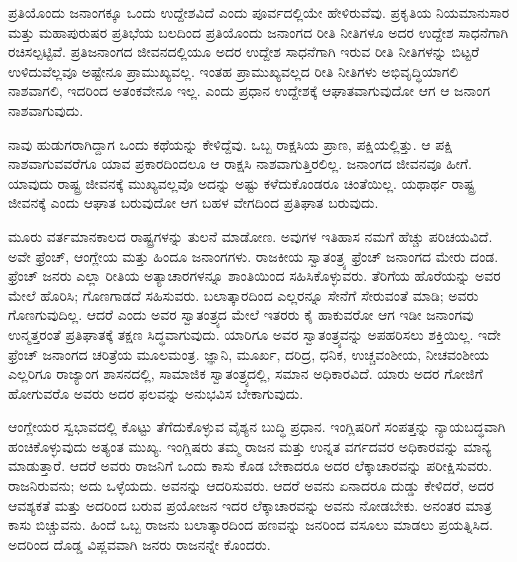 ಪ್ರತಿಯೊಂದು ಜನಾಂಗಕ್ಕೂ ಒಂದು ಉದ್ದೇಶವಿದೆ ಎಂದು ಪೂರ್ವದಲ್ಲಿಯೇ ಹೇಳಿರು\-ವೆವು. ಪ್ರಕೃತಿಯ ನಿಯಮಾನುಸಾರ ಮತ್ತು ಮಹಾಪುರುಷರ ಪ್ರತಿಭೆಯ ಬಲದಿಂದ ಪ್ರತಿಯೊಂದು ಜನಾಂಗದ ರೀತಿ ನೀತಿಗಳೂ ಅದರ ಉದ್ದೇಶ ಸಾಧನೆಗಾಗಿ ರಚಿಸಲ್ಪಟ್ಟಿವೆ. ಪ್ರತಿಜನಾಂಗದ ಜೀವನದಲ್ಲಿಯೂ ಅದರ ಉದ್ದೇಶ ಸಾಧನೆಗಾಗಿ ಇರುವ ರೀತಿ ನೀತಿಗಳನ್ನು ಬಿಟ್ಟರೆ ಉಳಿದುವೆಲ್ಲವೂ ಅಷ್ಟೇನೂ ಪ್ರಾಮುಖ್ಯವಲ್ಲ. ಇಂತಹ ಪ್ರಾಮುಖ್ಯವಲ್ಲದ ರೀತಿ ನೀತಿಗಳು ಅಭಿವೃದ್ಧಿಯಾಗಲಿ ನಾಶವಾಗಲಿ, ಇದರಿಂದ ಅತಂಕವೇನೂ ಇಲ್ಲ. ಎಂದು ಪ್ರಧಾನ ಉದ್ದೇಶಕ್ಕೆ ಆಘಾತವಾಗುವುದೋ ಆಗ ಆ ಜನಾಂಗ ನಾಶವಾಗುವುದು.

ನಾವು ಹುಡುಗರಾಗಿದ್ದಾಗ ಒಂದು ಕಥೆಯನ್ನು ಕೇಳಿದ್ದೆವು. ಒಬ್ಬ ರಾಕ್ಷಸಿಯ ಪ್ರಾಣ, ಪಕ್ಷಿಯಲ್ಲಿತ್ತು. ಆ ಪಕ್ಷಿ ನಾಶವಾಗುವವರೆಗೂ ಯಾವ ಪ್ರಕಾರದಿಂದಲೂ ಆ ರಾಕ್ಷಸಿ ನಾಶವಾಗುತ್ತಿರಲಿಲ್ಲ. ಜನಾಂಗದ ಜೀವನವೂ ಹೀಗೆ. ಯಾವುದು ರಾಷ್ಟ್ರ ಜೀವನಕ್ಕೆ ಮುಖ್ಯವಲ್ಲವೊ ಅದನ್ನು ಅಷ್ಟು ಕಳೆದುಕೊಂಡರೂ ಚಿಂತೆಯಿಲ್ಲ. ಯಥಾರ್ಥ ರಾಷ್ಟ್ರ ಜೀವನಕ್ಕೆ ಎಂದು ಆಘಾತ ಬರುವುದೋ ಆಗ ಬಹಳ ವೇಗದಿಂದ ಪ್ರತಿಘಾತ ಬರುವುದು.

ಮೂರು ವರ್ತಮಾನಕಾಲದ ರಾಷ್ಟ್ರಗಳನ್ನು ತುಲನೆ ಮಾಡೋಣ. ಅವುಗಳ ಇತಿಹಾಸ ನಮಗೆ ಹೆಚ್ಚು ಪರಿಚಯವಿದೆ. ಅವೇ ಫ್ರೆಂಚ್​, ಆಂಗ್ಲೇಯ ಮತ್ತು ಹಿಂದೂ ಜನಾಂಗಗಳು. ರಾಜಕೀಯ ಸ್ವಾತಂತ್ರ್ಯ ಫ್ರೆಂಚ್​ ಜನಾಂಗದ ಮೇರು ದಂಡ. ಫ್ರೆಂಚ್​ ಜನರು ಎಲ್ಲಾ ರೀತಿಯ ಅತ್ಯಾಚಾರಗಳನ್ನೂ ಶಾಂತಿಯಿಂದ ಸಹಿಸಿಕೊಳ್ಳುವರು. ತೆರಿಗೆಯ ಹೊರೆಯನ್ನು ಅವರ ಮೇಲೆ ಹೊರಿಸಿ; ಗೊಣಗಾಡದೆ ಸಹಿಸುವರು. ಬಲಾತ್ಕಾರದಿಂದ ಎಲ್ಲರನ್ನೂ ಸೇನೆಗೆ ಸೇರುವಂತೆ ಮಾಡಿ; ಅವರು ಗೊಣಗುವುದಿಲ್ಲ. ಆದರೆ ಎಂದು ಅವರ ಸ್ವಾತಂತ್ರ್ಯದ ಮೇಲೆ ಇತರರು ಕೈ ಹಾಕುವರೋ ಆಗ ಇಡೀ ಜನಾಂಗವು ಉನ್ಮತ್ತರಂತೆ ಪ್ರತಿಘಾತಕ್ಕೆ ತಕ್ಷಣ ಸಿದ್ಧವಾಗುವುದು. ಯಾರಿಗೂ ಅವರ ಸ್ವಾತಂತ್ರ್ಯವನ್ನು ಅಪಹರಿಸಲು ಶಕ್ತಿಯಿಲ್ಲ. ಇದೇ ಫ್ರೆಂಚ್​ ಜನಾಂಗದ ಚರಿತ್ರೆಯ ಮೂಲಮಂತ್ರ. ಜ್ಞಾನಿ, ಮೂರ್ಖ, ದರಿದ್ರ, ಧನಿಕ, ಉಚ್ಚವಂಶೀಯ, ನೀಚವಂಶೀಯ ಎಲ್ಲರಿಗೂ ರಾಜ್ಯಾಂಗ ಶಾಸನದಲ್ಲಿ, ಸಾಮಾಜಿಕ ಸ್ವಾತಂತ್ರ್ಯದಲ್ಲಿ, ಸಮಾನ ಅಧಿಕಾರವಿದೆ. ಯಾರು ಅದರ ಗೋಜಿಗೆ ಹೋಗುವರೊ ಅವರು ಅದರ ಫಲವನ್ನು ಅನುಭವಿಸ ಬೇಕಾಗುವುದು.

ಆಂಗ್ಲೇಯರ ಸ್ವಭಾವದಲ್ಲಿ ಕೊಟ್ಟು ತೆಗೆದುಕೊಳ್ಳುವ ವೈಶ್ಯನ ಬುದ್ಧಿ ಪ್ರಧಾನ. ಇಂಗ್ಲಿಷರಿಗೆ ಸಂಪತ್ತನ್ನು ನ್ಯಾಯಬದ್ಧವಾಗಿ ಹಂಚಿಕೊಳ್ಳುವುದು ಅತ್ಯಂತ ಮುಖ್ಯ. ಇಂಗ್ಲಿಷರು ತಮ್ಮ ರಾಜನ ಮತ್ತು ಉನ್ನತ ವರ್ಗದವರ ಅಧಿಕಾರವನ್ನು ಮಾನ್ಯ ಮಾಡುತ್ತಾರೆ. ಆದರೆ ಅವರು ರಾಜನಿಗೆ ಒಂದು ಕಾಸು ಕೊಡ ಬೇಕಾದರೂ ಅದರ ಲೆಕ್ಕಾಚಾರವನ್ನು ಪರೀಕ್ಷಿಸುವರು. ರಾಜನಿರುವನು; ಅದು ಒಳ್ಳೆಯದು. ಅವನನ್ನು ಆದರಿಸುವರು. ಆದರೆ ಅವನು ಏನಾದರೂ ದುಡ್ಡು ಕೇಳಿದರೆ, ಅದರ ಆವಶ್ಯಕತೆ ಮತ್ತು ಅದರಿಂದ ಬರುವ ಪ್ರಯೋಜನ ಇದರ ಲೆಕ್ಕಾಚಾರವನ್ನು ಅವನು ನೋಡಬೇಕು. ಅನಂತರ ಮಾತ್ರ ಕಾಸು ಬಿಚ್ಚುವನು. ಹಿಂದೆ ಒಬ್ಬ ರಾಜನು ಬಲಾತ್ಕಾರದಿಂದ ಹಣವನ್ನು ಜನರಿಂದ ವಸೂಲು ಮಾಡಲು ಪ್ರಯತ್ನಿಸಿದ. ಅದರಿಂದ ದೊಡ್ಡ ವಿಪ್ಲವವಾಗಿ ಜನರು ರಾಜನನ್ನೇ ಕೊಂದರು.

